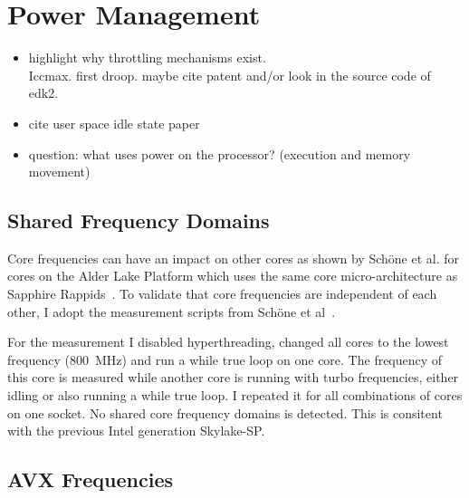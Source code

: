 \chapter{Power Management}

\begin{itemize}
    \item highlight why throttling mechanisms exist.\\
    Iccmax. first droop. maybe cite patent and/or look in the source code of edk2.
    \item cite user space idle state paper
    \item question: what uses power on the processor? (execution and memory movement)
\end{itemize}

\section{Shared Frequency Domains}
Core frequencies can have an impact on other cores as shown by Schöne et al. for cores on the Alder Lake Platform which uses the same core micro-architecture as Sapphire Rappids~\cite{Schoene_2024_Alder_Lake}.
To validate that core frequencies are independent of each other, I adopt the measurement scripts from Sch\"one et al~\cite{Schoene_2024_Alder_Lake}.

For the measurement I disabled hyperthreading, changed all cores to the lowest frequency (\SI{800}{\MHz}) and run a while true loop on one core.
The frequency of this core is measured while another core is running with turbo frequencies, either idling or also running a while true loop.
I repeated it for all combinations of cores on one socket.
No shared core frequency domains is detected.
This is consitent with the previous Intel generation Skylake-SP.

\section{AVX Frequencies}
\label{sec:avx-frequencies}

